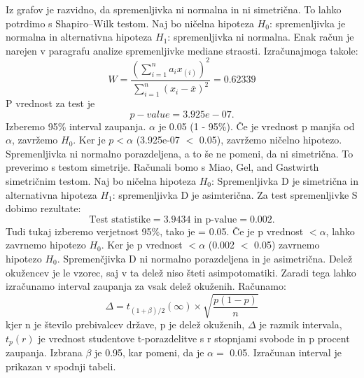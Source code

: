 \documentclass[a4paper,11pt]{article}
\begin{document}
Iz grafov je razvidno, da spremenljivka ni normalna in ni simetrična. To lahko potrdimo s Shapiro–Wilk testom. Naj bo ničelna hipoteza \(H_0\): spremenljivka je normalna in alternativna hipoteza \(H_1\): spremenljivka ni normalna. Enak račun je narejen v paragrafu analize spremenljivke mediane straosti. Izračunajmoga takole:
\[W = \frac{(\sum_{i = 1}^{n}a_i x_{(i)})^2}{\sum_{i = 1}^{n}(x_i - \overset{\_}{x})^2} = 0.62339\]
 P vrednost za test je 
\[ p-value = 3.925e-07. \]
Izberemo 95\% interval zaupanja. \(\alpha\) je 0.05 (1 - 95\%). Če je vrednost p manjša od \(\alpha\), zavržemo \(H_0\). Ker je \(p < \alpha\) (3.925e-07 \(<\) 0.05), zavržemo ničelno hipotezo. Spremenljivka ni normalno porazdeljena, a to še ne pomeni, da ni simetrična. To preverimo s testom simetrije. Računali bomo s Miao, Gel, and Gastwirth simetričnim testom. Naj bo ničelna hipoteza \(H_0\): Spremenljivka D je simetrična in alternativna hipoteza \(H_1\): spremenljivka D je asimterična. Za test spremenljivke S dobimo rezultate:
\[\text{Test statistike} = 3.9434 \text{ in p-value} =  0.002.\]
Tudi tukaj izberemo verjetnost 95\%, tako je \alpha = 0.05. Če je p vrednost \(< \alpha\), lahko zavrnemo hipotezo \(H_0\). Ker je p vrednost \(< \alpha\) (0.002 \(<\) 0.05) zavrnemo hipotezo \(H_0\). Spremenčjivka D ni normalno porazdeljena in je asimetrična. Delež okužencev je le vzorec, saj v ta delež niso šteti asimpotomatiki. Zaradi tega lahko izračunamo interval zaupanja za vsak delež okuženih. Računamo:
\[\Delta = t_{(1 + \beta) /2}(\infty) \times \sqrt{\frac{p(1 - p)}{n}}\]
kjer n je število prebivalcev države, p je delež okuženih, \(\Delta\) je razmik intervala, \(t_{p}(r)\) je vrednost studentove t-porazdelitve s r stopnjami svobode in p procent zaupanja. Izbrana \(\beta\) je 0.95, kar pomeni, da je \(\alpha = \) 0.05. Izračunan interval je prikazan v spodnji tabeli. \\
\end{document}
